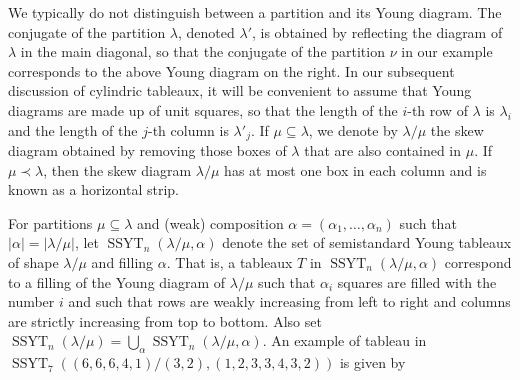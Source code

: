\documentclass[pdftex]{sigma}
\numberwithin{equation}{section}
\DeclareMathOperator{\SSYT}{SSYT}
\newcommand{\abs}[1]{\vert#1\vert}
\newcommand{\la}{\lambda}
\begin{document}
We typically do not distinguish between a partition and its Young diagram.
The conjugate of the partition $\la$, denoted $\la'$, is obtained by reflecting
the diagram of $\la$ in the main diagonal, so that the conjugate of the
partition $\nu$ in our example corresponds to the above Young diagram on
the right.
In our subsequent discussion of cylindric tableaux, it will be convenient to
assume that Young diagrams are made up of unit squares, so that the length
of the $i$-th row of $\la$ is $\la_i$ and the length of the $j$-th column is
$\la'_j$.
If $\mu\subseteq\la$, we denote by $\la/\mu$ the skew diagram obtained
by removing those boxes of $\la$ that are also contained in $\mu$.
If $\mu\prec\la$, then the skew diagram $\la/\mu$ has at most one box in each
column and is known as a horizontal strip.

For partitions $\mu\subseteq\la$ and (weak) composition
$\alpha=(\alpha_1,\dots,\alpha_n)$ such that $\abs{\alpha}=\abs{\la/\mu}$,
let $\SSYT_n(\la/\mu,\alpha)$ denote the set of semistandard Young
tableaux of shape $\la/\mu$ and filling $\alpha$.
That is, a tableaux $T$ in $\SSYT_n(\la/\mu,\alpha)$ correspond to a
filling of the Young diagram of $\la/\mu$ such that $\alpha_i$ squares
are filled with the number $i$ and such that rows are weakly increasing
from left to right and columns are strictly increasing from top to bottom.
Also set $\SSYT_n(\la/\mu)=\bigcup_{\alpha} \SSYT_n(\la/\mu,\alpha)$.
An example of tableau in $\SSYT_7((6,6,6,4,1)/(3,2),(1,2,3,3,4,3,2))$
is given by
\begin{center}
\end{center}
\end{document}
